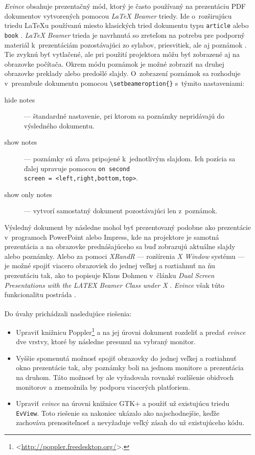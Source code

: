 \documentclass[12pt,oneside,final]{fithesis2}
\begin{document}
\emph{Evince} obsahuje prezentačný mód, ktorý je často používaný na prezentáciu PDF dokumentov vytvorených pomocou \emph{LaTeX Beamer} triedy. Ide o~rozširujúcu triedu LaTeXu používanú miesto klasických tried dokumentu typu \texttt{article} alebo \texttt{book} \cite{abclatex}. \emph{LaTeX Beamer} trieda je navrhnutá so zreteľom na potrebu pre podporný materiál k~prezentáciám pozostávajúci zo sylabov, priesvitiek, ale aj poznámok \cite{beamer}. Tie zvyknú byť vytlačené, ale pri použití projektora môžu byť zobrazené aj na obrazovke počítača. Okrem módu poznámok je možné zobraziť na druhej obrazovke preklady alebo predošlé slajdy. O~zobrazení poznámok sa rozhoduje v~preambule dokumentu pomocou \verb|\setbeameroption{}| s~týmito nastaveniami:
\begin{description}
\item[hide notes] --- štandardné nastavenie, pri ktorom sa poznámky nepridávajú do výsledného dokumentu.
\item[show notes] --- poznámky sú zľava pripojené k~jednotlivým slajdom. Ich pozícia sa ďalej upravuje pomocou \texttt{on second \\ screen = <left,right,bottom,top>}.
\item[show only notes]  --- vytvorí samostatný dokument pozostávajúci len z~poznámok.
\end{description}

Výsledný dokument by následne mohol byť prezentovaný podobne ako prezentácie v~programoch PowerPoint alebo Impress, kde na projektore je samotná prezentácia a na obrazovke prednášajúceho sa buď zobrazujú aktuálne slajdy alebo poznámky. Alebo za pomoci \emph{XRandR} --- rozšírenia \emph{X Window} systému --- je možné spojiť viacero obrazoviek do jednej veľkej a roztiahnuť na ňu prezentáciu tak, ako to popisuje Klaus Dohmen v~článku \emph{Dual Screen Presentations with the LATEX Beamer Class under X} \cite{dohmen}. \emph{Evince} však túto funkcionalitu postráda \cite{evbug}.
\\
\\
Do úvahy prichádzali nasledujúce riešenia:
\begin{itemize}
\item Upraviť knižnicu Poppler\footnote{<\url{http://poppler.freedesktop.org/}>.} a na jej úrovni dokument rozdeliť a predať \emph{evince} dve vrstvy, ktoré by následne presunul na vybraný monitor.
\item Vyššie spomenutá možnosť spojiť obrazovky do jednej veľkej a roztiahnuť okno prezentácie tak, aby poznámky boli na jednom monitore a prezentácia na druhom. Táto možnosť by ale vyžadovala rovnaké rozlíšenie obidvoch monitorov a znemožnila by podporu viacerých platforiem.
\item Upraviť \emph{evince} na úrovni knižnice GTK+ a použiť už existujúcu triedu \texttt{EvView}. Toto riešenie sa nakoniec ukázalo ako najschodnejšie, keďže zachováva prenositeľnosť a nevyžaduje veľký zásah do už existujúceho kódu.
\end{itemize}
\end{document}
